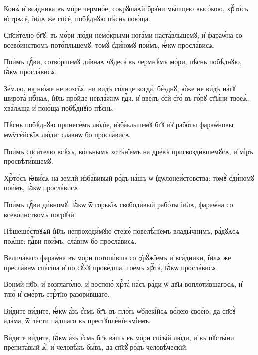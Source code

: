 
\label{tone.5}

\cuLettrine
Конѧ̀ и҆ вса́дника въ мо́ре чермно́е, сокрꙋша́ѧй бра̑ни  мы́шцею высо́кою, хрⷭ҇то́съ и҆стрѧсѐ, і҆и҃лѧ же сп҃сѐ,  побѣ́днꙋю пѣ́снь пою́ща. 
%

\hKv Сп҃си́телю бг҃ꙋ, въ мо́ри лю́ди немо́крыми  нога́ми наста́вльшемꙋ, и҆ фараѡ́на со всево́инствомъ  пото́пльшемꙋ: томꙋ̀ є҆ди́номꙋ пои́мъ, ꙗ҆́кѡ просла́висѧ. 
%

\hKv Пои́мъ гдⷭ҇ви, сотво́ршемꙋ ди̑внаѧ чꙋдеса̀ въ чермнѣ́мъ  мо́ри, пѣ́снь побѣ́днꙋю, ꙗ҆́кѡ просла́висѧ.  

\hKv Зе́млю, на ню́же не возсїѧ̀, ни ви́дѣ со́лнце когда̀,  бе́зднꙋ, ю҆́же не ви́дѣ на́гꙋ широта̀ нбⷭ҇наѧ, і҆и҃ль  про́йде невла́жнѡ гдⷭ҇и, и҆ вве́лъ є҆сѝ є҆го̀ въ го́рꙋ  ст҃ы́ни твоеѧ̀, хва́лѧща и҆ пою́ща побѣ́днꙋю пѣ́снь. 

\hKv Пѣ́снь побѣ́днꙋю принесе́мъ лю́дїе, и҆зба́вльшемꙋ бг҃ꙋ  и҆з̾ рабо́ты фараѡ́новы мѡѷсє́йскїѧ лю́ди: сла́внѡ бо  просла́висѧ.

\hKv Пои́мъ сп҃си́телю всѣ́хъ, во́льнымъ хотѣ́нїемъ на дре́вѣ  пригвозди́вшемꙋсѧ, и҆ мі́ръ просвѣти́вшемꙋ. 

\hKv Хрⷭ҇то́съ ꙗ҆ви́сѧ на землѝ и҆зба́вивый ро́дъ на́шъ ѿ  і҆дѡлонеи́стовства: томꙋ̀ є҆ди́номꙋ пои́мъ, ꙗ҆́кѡ  просла́висѧ. 

\hKv Пои́мъ гдⷭ҇ви ди́вномꙋ, ꙗ҆́кѡ ѿ го́рькїѧ свободи́вый  рабо́ты і҆и҃лѧ, фараѡ́на со всево́инствомъ погрꙋзѝ. 

\hKv Пѣшеше́ствꙋѧй і҆и҃ль непроходи́мꙋю стезю̀ повелѣ́нїемъ  влады́чнимъ, ра́дꙋѧсѧ поѧ́ше: гдⷭ҇ви пои́мъ, сла́внѡ бо  просла́висѧ.  

\hKv Велича́ваго фараѡ́на въ мо́ри потопи́вша со ѻ҆рꙋ́жїемъ и҆  вса́дники, і҆и҃лѧ же пресла́внѡ спа́сша и҆ по сꙋ́хꙋ  прове́дша, пое́мъ хрⷭ҇та̀, ꙗ҆́кѡ просла́висѧ.
%

\hKv Вонмѝ нб҃о, и҆ возглаго́лю, и҆ воспою̀ хрⷭ҇та̀ на́съ ра́ди  ѿ дв҃ы воплоти́вшагосѧ, и҆ тлю̀ и҆ сме́рть стрⷭ҇тїю  разори́вшаго. 
%

\hKv Ви́дите ви́дите, ꙗ҆́кѡ  а҆́зъ є҆́смь бг҃ъ въ пло́ть ѡ҆блекі́йсѧ во́лею свое́ю, да  сп҃сꙋ̀ а҆да́ма, ѿ ле́сти па́дшаго въ престꙋпле́нїе  ѕмі́емъ. 

\hKv Ви́дите ви́дите, ꙗ҆́кѡ а҆́зъ є҆́смь бг҃ъ ва́шъ въ мо́ри  сп҃сы́й лю́ди, и҆ въ пꙋсты́ни препита́вый ѧ҆̀, и҆ человѣ́къ  бы́въ, да сп҃сꙋ̀ ро́дъ человѣ́ческїй. 

